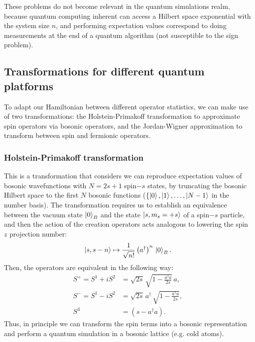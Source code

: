 \documentclass[a4paper]{report}
\begin{document}
\begin{spacing}{1.1}
These problems do not become relevant in the quantum simulations realm, because quantum computing inherent can access a Hilbert space exponential with the system size $n$, and performing expectation values correspond to doing measurements at the end of a quantum algorithm (not susceptible to the sign problem). 

\subsection{Transformations for different quantum platforms}

To adapt our Hamiltonian between different operator statistics, we can make use of two transformations: the Holstein-Primakoff transformation to approximate spin operators via bosonic operators, and the Jordan-Wigner approximation to transform between spin and fermionic operators.

\subsubsection{Holstein-Primakoff transformation}

This is a transformation that considers we can reproduce expectation values of bosonic wavefunctions with $N = 2s+1$ spin$-s$ states, by truncating the bosonic Hilbert space to the first $N$ bosonic functions ($\{ \ket{0},\ket{1},\dots,\ket{N-1}$ in the number basis). The transformation requires us to establish an equivalence between the vacuum state $\ket{0}_B$ and the state $\ket{s,m_s=+s}$ of a spin$-s$ particle, and then the action of the creation operators acts analogous to lowering the spin $z$ projection number:
\begin{equation}
    \ket{s,s-n} \mapsto \frac{1}{\sqrt{n!}}\left( a^\dagger \right)^n \, \ket{0}_B.
\end{equation}
Then, the operators are equivalent in the following way:
\begin{align}
    S^+ = S^1 + iS^2 &= \sqrt{2s} \, \sqrt{1-\frac{a^\dagger a}{2s}} \, a, \\
    S^- = S^1 - iS^2 &= \sqrt{2s} \, a^\dagger \, \sqrt{1-\frac{a^\dagger a}{2s}}, \\
    S^3 &= (s-a^\dagger a).
\end{align}
Thus, in principle we can transform the spin terms into a bosonic representation and perform a quantum simulation in a bosonic lattice (e.g. cold atoms).


\end{spacing}
\end{document}
